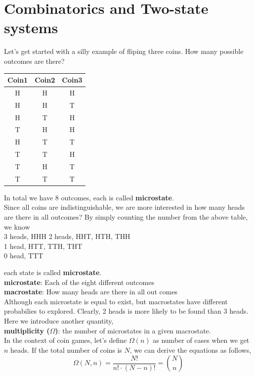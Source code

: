 \documentclass[twoside]{article}
\begin{document}
\section{Combinatorics and Two-state systems}
Let's get started with a silly example of fliping three coins. How many possible outcomes are there?
\begin{tabular}{c c c}
Coin1 & Coin2 & Coin3 \\\hline
  H & H & H \\
  H & H & T \\
  H & T & H \\
  T & H & H \\
  H & T & T \\
  T & T & H \\
  T & H & T \\
  T & T & T \\\hline
\end{tabular}

In total we have 8 outcomes, each is called {\bf microstate}.\\
Since all coins are indistinguishable, we are more interested in how many heads are there in all outcomes?
By simply counting the number from the above table, we know \\
3 heads,  HHH 
2 heads,  HHT, HTH, THH \\
1 head,   HTT, TTH, THT \\
0 head,   TTT

each state is called {\bf microstate}.\\
{\bf microstate}: Each of the eight different outcomes\\
{\bf macrostate}: How many heads are there in all out comes\\

Although each microstate is equal to exist, but macrostates have different probabilies to explored.
Clearly, 2 heads is more likely to be found than 3 heads.
Here we introduce another quantity,\\
{\bf multiplicity ($\Omega$)}: the number of microstates in a given macrostate.\\

In the context of coin games, let's define $\Omega(n)$ as number of cases when we get $n$ heads.
If the total number of coins is $N$, we can derive the equations as follows,
\begin{equation}
 \Omega(N, n) = \frac{N!}{n!\cdot(N-n)!} = \binom{N}{n} 
\end{equation}
\end{document}
